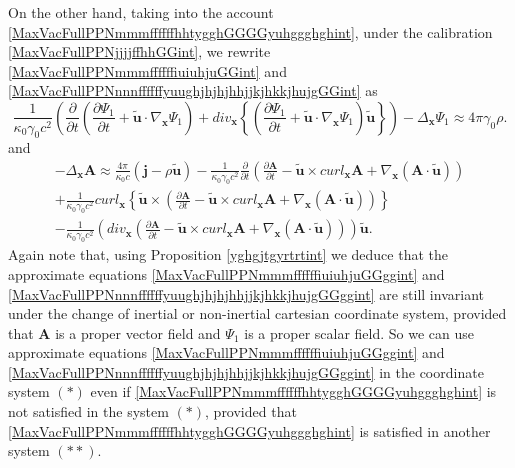 \documentclass{article}
\theoremstyle{definition}
\theoremstyle{remark}
\renewcommand{\vec}[1]{\mathbf{#1}}
\newcommand{\er}{\eqref}
\newcommand{\er}{\eqref}
\begin{document}
On the other hand, taking into the account
\er{MaxVacFullPPNmmmffffffhhtygghGGGGyuhggghghint}, under the
calibration \er{MaxVacFullPPNjjjjffhhGGint}, we rewrite
\er{MaxVacFullPPNmmmffffffiuiuhjuGGint} and
\er{MaxVacFullPPNnnnffffffyuughjhjhjhhjjkjhkkjhujgGGint} as
\begin{equation}\label{MaxVacFullPPNmmmffffffiuiuhjuGGggint}
\frac{1}{\kappa_0\gamma_0 c^2}\left(\frac{\partial}{\partial
t}\left(\frac{\partial\Psi_1}{\partial t}+\vec {\tilde
u}\cdot\nabla_{\vec x}\Psi_1\right)+div_{\vec x}
\left\{\left(\frac{\partial\Psi_1}{\partial t}+\vec {\tilde
u}\cdot\nabla_{\vec x}\Psi_1\right)\vec {\tilde
u}\right\}\right)-\Delta_{\vec x}\Psi_1\approx 4\pi\gamma_0\rho.
\end{equation}
and
\begin{multline}\label{MaxVacFullPPNnnnffffffyuughjhjhjhhjjkjhkkjhujgGGggint}
-\Delta_{\vec x}\vec A\approx \frac{4\pi}{\kappa_0 c}\left(\vec
j-\rho\vec {\tilde u}\right)-\frac{1}{\kappa_0\gamma_0
c^2}\frac{\partial}{\partial t}\left(\frac{\partial\vec A}{\partial
t}-\vec {\tilde u}\times curl_{\vec x}\vec A+\nabla_{\vec
x}\left(\vec A\cdot\vec {\tilde
u}\right)\right)\\+\frac{1}{\kappa_0\gamma_0 c^2}curl_{\vec x}
\left\{\vec {\tilde u}\times
\left(\frac{\partial\vec A}{\partial t}-\vec {\tilde u}\times
curl_{\vec x}\vec A+\nabla_{\vec x}\left(\vec A\cdot\vec {\tilde
u}\right)\right)\right\}\\-\frac{1}{\kappa_0\gamma_0
c^2}\left(div_{\vec x}\left(\frac{\partial\vec A}{\partial t}-\vec
{\tilde u}\times curl_{\vec x}\vec A+\nabla_{\vec x}\left(\vec
A\cdot\vec {\tilde u}\right)\right)\right)\vec {\tilde u}.
\end{multline}
Again note that, using Proposition \ref{yghgjtgyrtrtint} we deduce
that the approximate equations
\er{MaxVacFullPPNmmmffffffiuiuhjuGGggint} and
\er{MaxVacFullPPNnnnffffffyuughjhjhjhhjjkjhkkjhujgGGggint} are still
invariant under the change of inertial or non-inertial cartesian
coordinate system, provided that $\vec A$ is a proper vector field
and $\Psi_1$ is a proper scalar field. So we can use approximate
equations \er{MaxVacFullPPNmmmffffffiuiuhjuGGggint} and
\er{MaxVacFullPPNnnnffffffyuughjhjhjhhjjkjhkkjhujgGGggint} in the
coordinate system $(*)$ even if
\er{MaxVacFullPPNmmmffffffhhtygghGGGGyuhggghghint} is not satisfied
in the system $(*)$, provided that
\er{MaxVacFullPPNmmmffffffhhtygghGGGGyuhggghghint} is satisfied in
another system $(**)$.
\end{document}
